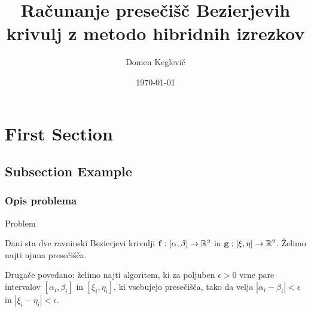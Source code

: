 \documentclass[unknownkeysallowed]{beamer}
\title[Metoda hibridnih izrezkov]{Računanje presečišč Bezierjevih krivulj z metodo hibridnih izrezkov} %
\author{Domen Keglevič} %
\institute[] %
{
Fakulteta za matematiko in fiziko \\ %
\medskip
}
\date{\today} %
\def\R{\mathbb R}
\begin{document}
\begin{frame}
\titlepage %
\end{frame}

\section{First Section} %

\subsection{Subsection Example} %

\begin{frame}
\frametitle{Opis problema} 
\begin{block}{Problem}

Dani sta dve ravninski Bezierjevi krivulji ${\bf f}: [\alpha,\beta]\rightarrow \R ^2$ in ${\bf g}:[\xi,\eta]\rightarrow \R^2$. Želimo najti njuna presečišča.

\medskip

Drugače povedano: želimo najti algoritem, ki za poljuben $\epsilon >0$ vrne pare intervalov $[\alpha _i,\beta _i]$ in  $[\xi _i, \eta _i]$, ki vsebujejo presečišča, tako da velja $|\alpha _i - \beta _i| < \epsilon$ in  $|\xi _i - \eta _i| < \epsilon$.
\end{block}
\end{frame}
\end{document}

